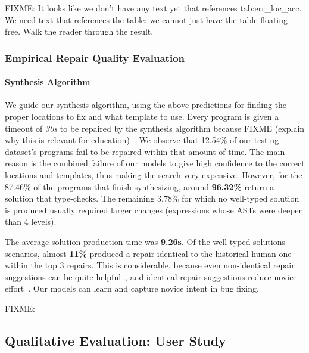 FIXME: It looks like we don't have any text yet that references
tab:err\_loc\_acc. We need text that references the table: we cannot just
have the table floating free. Walk the reader through the result.

\subsubsection{Empirical Repair Quality Evaluation}
\label{subsubsec:man_rep_qual_eval}

\paragraph{Synthesis Algorithm}
We guide our synthesis algorithm, using the above predictions for finding the
proper locations to fix and what template to use. Every program is given a timeout of
\emph{30s} to be repaired by the synthesis algorithm because
FIXME (explain why this is relevant for education)~\cite{FIXME}. We observe that
12.54\% of our testing dataset's programs fail to be repaired within
that amount of time. The main reason is the combined failure of our
models to give high confidence to the correct locations and templates, thus
making the search very expensive. However, for the 87.46\% of the programs that
finish synthesizing, around \textbf{96.32\%} return a solution that
type-checks. The remaining 3.78\% for which no well-typed solution is
produced usually required larger changes (\ie expressions whose ASTs were
deeper than 4 levels).

The average solution production time
was \textbf{9.26s}. Of the well-typed solutions scenarios, almost
\textbf{11\%} produced a repair identical to the historical human one
within the top 3 repairs. This is considerable, because even non-identical
repair suggestions can be quite helpful~\cite{FIXME}, and identical
repair suggestions reduce novice effort~\cite{FIXME}.
Our models can learn and capture novice intent in bug fixing.

FIXME: 


\subsection{Qualitative Evaluation: User Study}
\label{subsec:qual_eval}

